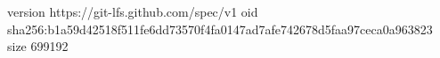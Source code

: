 version https://git-lfs.github.com/spec/v1
oid sha256:b1a59d42518f511fe6dd73570f4fa0147ad7afe742678d5faa97ceca0a963823
size 699192
